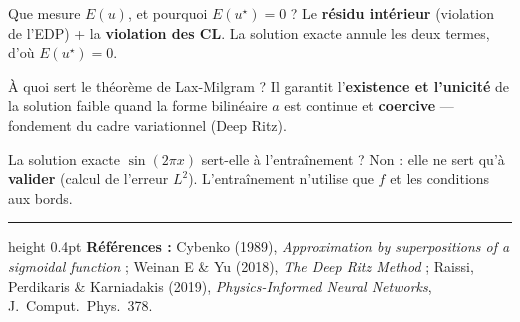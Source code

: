 \documentclass[11pt]{article}
\newcommand{\key}[1]{\textbf{#1}}
\begin{document}
\begin{qbox}{Que mesure $E(u)$, et pourquoi $E(u^\star)=0$ ?}
Le \key{résidu intérieur} (violation de l'EDP) + la \key{violation des CL}. La
solution exacte annule les deux termes, d'où $E(u^\star)=0$.
\end{qbox}

\begin{qbox}{À quoi sert le théorème de Lax-Milgram ?}
Il garantit l'\key{existence et l'unicité} de la solution faible quand la forme
bilinéaire $a$ est continue et \key{coercive} — fondement du cadre variationnel
(Deep Ritz).
\end{qbox}

\begin{qbox}{La solution exacte $\sin(2\pi x)$ sert-elle à l'entraînement ?}
Non : elle ne sert qu'à \key{valider} (calcul de l'erreur $L^2$). L'entraînement
n'utilise que $f$ et les conditions aux bords.
\end{qbox}

\vfill
\hrule height 0.4pt
{\footnotesize\color{gray}\textbf{Références :} Cybenko (1989), \emph{Approximation by
superpositions of a sigmoidal function} ; Weinan E \& Yu (2018), \emph{The Deep Ritz
Method} ; Raissi, Perdikaris \& Karniadakis (2019), \emph{Physics-Informed Neural
Networks}, J.\ Comput.\ Phys.\ 378.}
\end{document}
